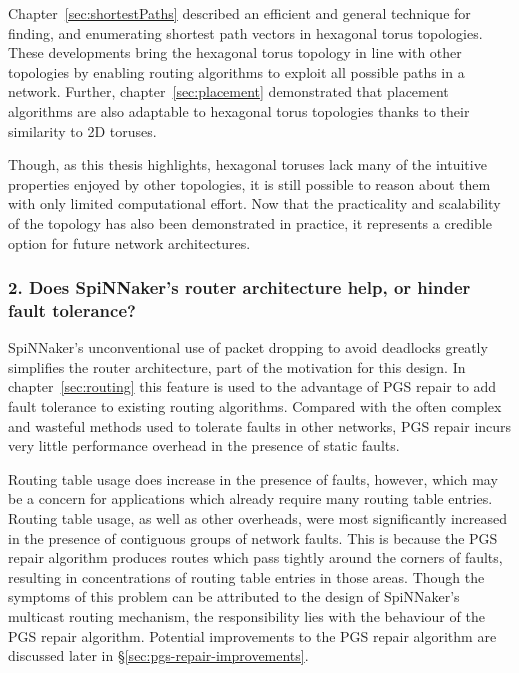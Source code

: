 		Chapter~\ref{sec:shortestPaths} described an efficient and general
		technique for finding, and enumerating shortest path vectors in hexagonal
		torus topologies. These developments bring the hexagonal torus topology in
		line with other topologies by enabling routing algorithms to exploit all
		possible paths in a network. Further, chapter~\ref{sec:placement}
		demonstrated that placement algorithms are also adaptable to hexagonal
		torus topologies thanks to their similarity to 2D toruses.
		
		Though, as this thesis highlights, hexagonal toruses lack many of the
		intuitive properties enjoyed by other topologies, it is still possible to
		reason about them with only limited computational effort.  Now that the
		practicality and scalability of the topology has also been demonstrated in
		practice, it represents a credible option for future network architectures.
		
		\subsubsection{2. Does SpiNNaker's router architecture help, or hinder
		fault tolerance?}
		
		SpiNNaker's unconventional use of packet dropping to avoid deadlocks
		greatly simplifies the router architecture, part of the motivation for this
		design. In chapter~\ref{sec:routing} this feature is used to the advantage
		of PGS repair to add fault tolerance to existing routing algorithms.
		Compared with the often complex and wasteful methods used to tolerate
		faults in other networks, PGS repair incurs very little performance
		overhead in the presence of static faults.
		
		Routing table usage does increase in the presence of faults, however, which
		may be a concern for applications which already require many routing table
		entries. Routing table usage, as well as other overheads, were most
		significantly increased in the presence of contiguous groups of network
		faults. This is because the PGS repair algorithm produces routes which pass
		tightly around the corners of faults, resulting in concentrations of
		routing table entries in those areas.  Though the symptoms of this problem
		can be attributed to the design of SpiNNaker's multicast routing mechanism,
		the responsibility lies with the behaviour of the PGS repair algorithm.
		Potential improvements to the PGS repair algorithm are discussed later in
		\S\ref{sec:pgs-repair-improvements}.
		
